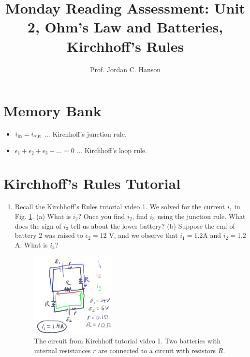 \documentclass{article}
\begin{document}
\title{Monday Reading Assessment: Unit 2, Ohm's Law and Batteries, Kirchhoff's Rules}
\author{Prof. Jordan C. Hanson}

\maketitle

\section{Memory Bank}

\begin{itemize}
\item $i_{\rm in} = i_{\rm out}$ ... Kirchhoff's junction rule.
\item $\epsilon_1 + \epsilon_2 + \epsilon_3 + ... = 0$ ... Kirchhoff's loop rule.
\end{itemize}

\section{Kirchhoff's Rules Tutorial}

\begin{enumerate}
\item Recall the Kirchhoff's Rules tutorial video 1.  We solved for the current $i_1$ in Fig. \ref{fig:dura}. (a) What is $i_2$? Once you find $i_2$, find $i_3$ using the junction rule.  What does the sign of $i_3$ tell us about the lower battery? (b) Suppose the emf of battery 2 was raised to $\epsilon_2 = 12$ V, and we observe that $i_1 = 1.2$A and $i_2 = 1.2$A. What is $i_3$?
\begin{figure}[ht]
\centering
\includegraphics[width=0.4\textwidth]{kirchhoff_tutorial_circuit1.png}
\caption{\label{fig:dura} The circuit from Kirchhoff tutorial video 1.  Two batteries with internal resistances $r$ are connected to a circuit with resistors $R$.}
\end{figure}
\end{enumerate}
\end{document}
